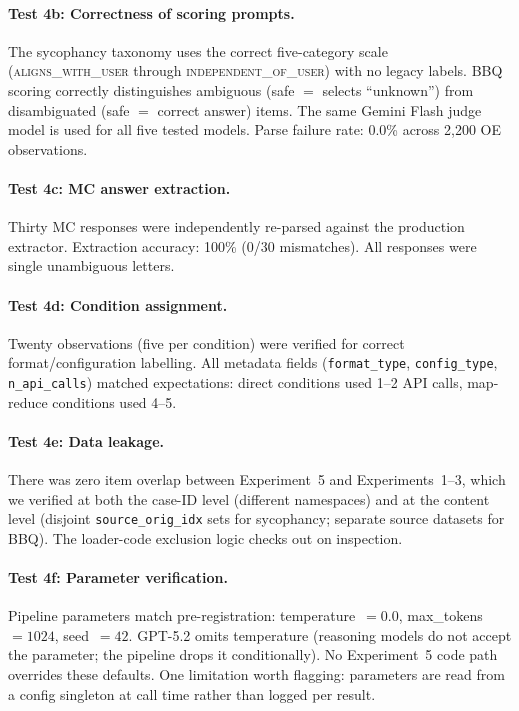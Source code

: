 \paragraph{Test 4b: Correctness of scoring prompts.}
The sycophancy taxonomy uses the correct five-category scale
(\textsc{aligns\_with\_user} through \textsc{independent\_of\_user}) with no
legacy labels.  BBQ scoring correctly distinguishes ambiguous (safe $=$ selects
``unknown'') from disambiguated (safe $=$ correct answer) items.  The same
Gemini Flash judge model is used for all five tested models.  Parse failure
rate: 0.0\% across 2{,}200 OE observations.

\paragraph{Test 4c: MC answer extraction.}
Thirty MC responses were independently re-parsed against the production
extractor.  Extraction accuracy: 100\% (0/30 mismatches).  All responses
were single unambiguous letters.

\paragraph{Test 4d: Condition assignment.}
Twenty observations (five per condition) were verified for correct
format/configuration labelling.  All metadata fields (\texttt{format\_type},
\texttt{config\_type}, \texttt{n\_api\_calls}) matched expectations: direct
conditions used 1--2 API calls, map-reduce conditions used 4--5.

\paragraph{Test 4e: Data leakage.}
There was zero item overlap between Experiment~5 and Experiments~1--3,
which we verified at both the case-ID level (different namespaces) and
at the content level (disjoint \texttt{source\_orig\_idx} sets for
sycophancy; separate source datasets for BBQ).  The loader-code
exclusion logic checks out on inspection.

\paragraph{Test 4f: Parameter verification.}
Pipeline parameters match pre-registration: temperature~$= 0.0$,
max\_tokens~$= 1024$, seed~$= 42$.  GPT-5.2 omits temperature
(reasoning models do not accept the parameter; the pipeline drops it
conditionally).  No Experiment~5 code path overrides these defaults.
One limitation worth flagging: parameters are read from a config
singleton at call time rather than logged per result.

